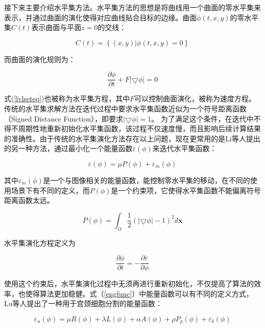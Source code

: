 \documentclass[nomlist,masters]{seuthesix}
\begin{document}
接下来主要介绍水平集方法。水平集方法\cite{Osher1988Fronts}的思想是将曲线用一个曲面的零水平集来表示，并通过曲面的演化使得对应曲线贴合目标的边缘。曲面$\phi (t,x,y)$的零水平集$C(t)$表示曲面与平面$z=0$的交线：

\begin{equation}
C(t)=\left \{ (x,y)| \phi (t,x,y)=0  \right \}
\end{equation}

而曲面的演化规则为：

\begin{equation}
\frac{\partial \phi }{\partial t}+F\left | \bigtriangledown \phi \right |=0
\label{lvlseteq}
\end{equation}

式(\ref{lvlseteq})也被称为水平集方程，其中$F$可以控制曲面演化，被称为速度方程。传统的水平集求解方法在迭代过程中要求水平集函数近似为一个符号距离函数（Signed Distance Function），即要求$\left | \bigtriangledown \phi \right |=1$。
为了满足这个条件，在迭代中不得不周期性地重新初始化水平集函数，该过程不仅速度慢，而且影响后续计算结果的准确性。由于传统的水平集演化方法存在以上问题，现在更常用的是Li等人\cite{Li2005Level}提出的另一种方法，通过最小化一个能量函数$\varepsilon(\phi )$来迭代水平集函数：

\begin{equation}
\varepsilon (\phi )=\mu P(\phi )+\varepsilon_{m} (\phi )
\label{engfunc}
\end{equation}



其中$\varepsilon_{m}(\phi )$是一个与图像相关的能量函数，能控制零水平集的移动，在不同的使用场景下有不同的定义，而$P(\phi )$是一个约束项，它使得水平集函数不能偏离符号距离函数太远。

\begin{equation}
P(\phi )=\int_{\Omega }\frac{1}{2}(|\bigtriangledown \phi |-1)^{2}d\mathbf{x}
\end{equation}

水平集演化方程定义为

\begin{equation}
\frac{\partial \phi }{\partial t}=-\frac{\partial \varepsilon }{\partial \phi }
\label{lvlseteqt}
\end{equation}

使用这个约束后，水平集演化过程中无须再进行重新初始化，不仅提高了算法的效率，也使得算法更加稳健。式（\ref{engfunc}）中能量函数可以有不同的定义方式，Lu等人\cite{Lu2013Automated}提出了一种用于宫颈细胞分割的能量函数：


\begin{equation}
\varepsilon _{u}(\phi)=\mu R({\phi})+\lambda L({\phi})+\alpha A({\phi})+\rho P_{p}({\phi})+\varepsilon _{b}(\phi)
\label{LevelSetEu}
\end{equation}
\end{document}
